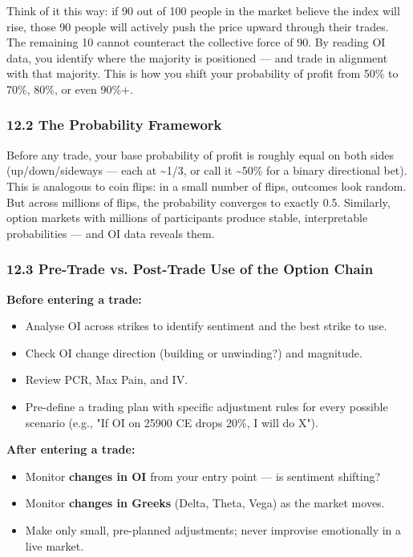 \documentclass[12pt,openany]{book}
\begin{document}
Think of it this way: if 90 out of 100 people in the market believe the index will rise, those 90 people will actively push the price upward through their trades. The remaining 10 cannot counteract the collective force of 90. By reading OI data, you identify where the majority is positioned — and trade in alignment with that majority. This is how you shift your probability of profit from 50\% to 70\%, 80\%, or even 90\%+.

\subsubsection{12.2 The Probability Framework}

Before any trade, your base probability of profit is roughly equal on both sides (up/down/sideways — each at \textasciitilde{}1/3, or call it \textasciitilde{}50\% for a binary directional bet). This is analogous to coin flips: in a small number of flips, outcomes look random. But across millions of flips, the probability converges to exactly 0.5. Similarly, option markets with millions of participants produce stable, interpretable probabilities — and OI data reveals them.

\subsubsection{12.3 Pre-Trade vs. Post-Trade Use of the Option Chain}

\textbf{Before entering a trade:}
\begin{itemize}[leftmargin=*]
    \item Analyse OI across strikes to identify sentiment and the best strike to use.
    \item Check OI change direction (building or unwinding?) and magnitude.
    \item Review PCR, Max Pain, and IV.
    \item Pre-define a trading plan with specific adjustment rules for every possible scenario (e.g., "If OI on 25900 CE drops 20\%, I will do X").
\end{itemize}

\textbf{After entering a trade:}
\begin{itemize}[leftmargin=*]
    \item Monitor \textbf{changes in OI} from your entry point — is sentiment shifting?
    \item Monitor \textbf{changes in Greeks} (Delta, Theta, Vega) as the market moves.
    \item Make only small, pre-planned adjustments; never improvise emotionally in a live market.
\end{itemize}
\end{document}
